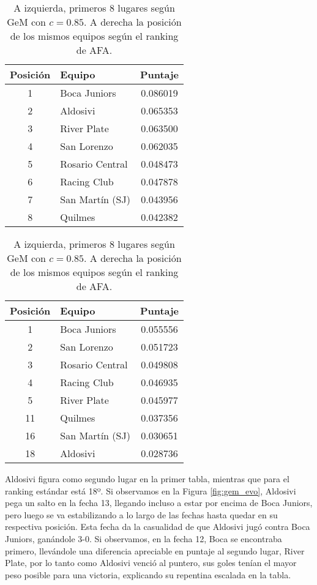 \begin{table}[H]
	\centering
    \begin{center}
		\begin{tabular}{| c | l | c |}
			\hline
			Posición & Equipo & Puntaje \\ \hline
			1 & Boca Juniors & 0.086019 \\
			2 & Aldosivi & 0.065353 \\
			3 & River Plate & 0.063500 \\
			4 & San Lorenzo & 0.062035 \\
			5 & Rosario Central & 0.048473 \\
			6 & Racing Club & 0.047878 \\
			7 & San Martín (SJ) & 0.043956 \\
			8 & Quilmes & 0.042382 \\
			\hline
		\end{tabular}
		\begin{tabular}{| c | l | c |}
			\hline
			Posición & Equipo & Puntaje \\ \hline
			1 & Boca Juniors & 0.055556 \\
			2 & San Lorenzo & 0.051723 \\
			3 & Rosario Central & 0.049808 \\
			4 & Racing Club & 0.046935 \\
			5 & River Plate & 0.045977 \\
			11 & Quilmes & 0.037356 \\
			16 & San Martín (SJ) & 0.030651 \\
			18 & Aldosivi & 0.028736 \\
			\hline
		\end{tabular}
    \end{center}
	\caption{A izquierda, primeros 8 lugares según GeM con $c = 0.85$. A derecha
	la posición de los mismos equipos según el ranking de AFA.}
	\label{fig:primeros8}
\end{table}

Aldosivi figura como segundo lugar en la primer tabla, mientras que para el
ranking estándar está 18º. Si observamos en la Figura \ref{fig:gem_evo},
Aldosivi pega un salto en la fecha 13, llegando incluso a estar por encima de
Boca Juniors, pero luego se va estabilizando a lo largo de las fechas hasta
quedar en su respectiva posición. Esta fecha da la casualidad de que Aldosivi
jugó contra Boca Juniors, ganándole 3-0. Si observamos, en la fecha 12, Boca se
encontraba primero, llevándole una diferencia apreciable en puntaje al
segundo lugar, River Plate, por lo tanto como Aldosivi venció al puntero, sus
goles tenían el mayor peso posible para una victoria, explicando su repentina
escalada en la tabla.


